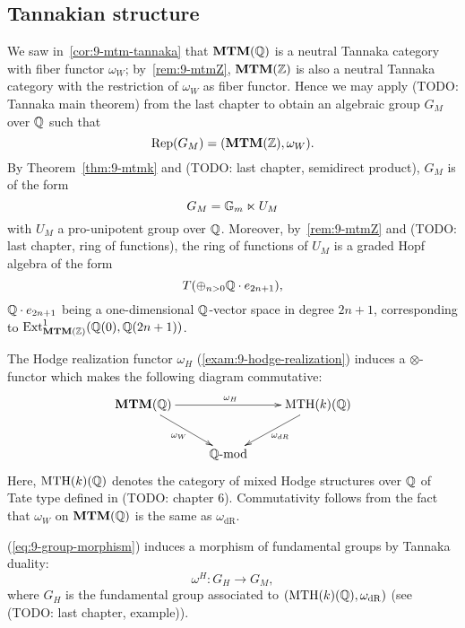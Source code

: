 \subsection{Tannakian structure}
We saw in~\ref{cor:9-mtm-tannaka} that $\mathbf{MTM}(\mathbb{Q})$ is a neutral Tannaka
category with fiber functor $\omega_{W}$; by~\ref{rem:9-mtmZ},
$\mathbf{MTM}(\mathbb{Z})$ is also a neutral Tannaka category with the restriction of
$\omega_{W}$ as fiber functor. Hence we may apply (TODO: Tannaka main
theorem) from the last chapter to obtain an algebraic group $G_M$ over
$\mathbb{Q}$ such that
\begin{equation}\label{eq:9-mtmZ-gm}
  \mathrm{Rep}(G_M) = (\mathbf{MTM}(\mathbb{Z}), \omega_{W}).
\end{equation}
By Theorem~\ref{thm:9-mtmk} and (TODO: last chapter, semidirect
product), $G_{M}$ is of the form
\begin{equation*}
  G_{M}=\mathbb{G}_m\ltimes U_{M}
\end{equation*}
with $U_{M}$ a pro-unipotent group over $\mathbb{Q}$. Moreover,
by~\ref{rem:9-mtmZ} and (TODO: last chapter, ring of functions), the
ring of functions of $U_{M}$ is a graded Hopf algebra of the form
\begin{equation}\label{eq:9-hopfalgebra}
  T(\oplus_{n>0}\mathbb{Q}\cdot e_{2n+1}),
\end{equation}
$\mathbb{Q}\cdot e_{2n+1}$ being a one-dimensional $\mathbb{Q}$-vector space in degree
$2n+1$, corresponding to $\mathrm{Ext}^{1}_{\mathbf{MTM}(\mathbb{Z})}(\mathbb{Q}(0),\mathbb{Q}(2n+1))$.

The Hodge realization functor $\omega_{H}$
(\ref{exam:9-hodge-realization}) induces a $\otimes$-functor which
makes the following diagram commutative:
\begin{equation}
\xymatrix{
\MTM(\Q) \ar[rr]^{\omega_H} \ar[dr]_{\omega_{W}} && \MTH(\Q) \ar[dl]^{\omega_{dR}} \\
&\Q\Mod}\label{eq:9-group-morphism}
\end{equation}
Here, $\mathrm{MTH}(k)(\mathbb{Q})$ denotes the category of mixed Hodge structures over
$\mathbb{Q}$ of Tate type defined in (TODO: chapter 6). Commutativity follows
from the fact that $\omega_{W}$ on $\mathbf{MTM}(\mathbb{Q})$ is the same as
$\omega_{\mathrm{dR}}$.

(\ref{eq:9-group-morphism}) induces a morphism of fundamental groups
by Tannaka duality:
\begin{equation*}
  \omega^{H}:G_{H}\to G_{M},
\end{equation*}
where $G_{H}$ is the fundamental group associated to
$(\mathrm{MTH}(k)(\mathbb{Q}),\omega_{\mathrm{dR}})$ (see (TODO: last chapter, example)).


